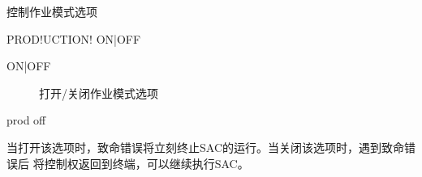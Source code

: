 \label{cmd:production}

控制作业模式选项

\begin{SACSTX}
PROD!UCTION! ON|OFF
\end{SACSTX}

\begin{description}
\item [ON|OFF] 打开/关闭作业模式选项
\end{description}

\begin{SACDFT}
prod off
\end{SACDFT}

当打开该选项时，致命错误将立刻终止SAC的运行。当关闭该选项时，遇到致命错误后
将控制权返回到终端，可以继续执行SAC。
